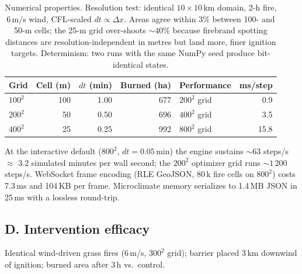 \documentclass[11pt]{article}
\begin{document}
\begin{table}[htbp]
\centering
\caption{Numerical properties. Resolution test: identical
$10{\times}10$\,km domain, 2-h fire, 6\,m/s wind, CFL-scaled
$dt \propto \Delta x$. Areas agree within 3\% between 100- and 50-m cells;
the 25-m grid over-shoots ${\sim}40\%$ because firebrand spotting
distances are resolution-independent in metres but land more, finer
ignition targets. Determinism: two runs with the same NumPy seed produce
bit-identical states.}
\begin{tabular}{lrrr@{\qquad}lr}
\toprule
Grid & Cell (m) & $dt$ (min) & Burned (ha) & Performance & ms/step \\
\midrule
$100^2$ & 100 & 1.00 & 677 & $200^2$ grid & 0.9 \\
$200^2$ &  50 & 0.50 & 696 & $400^2$ grid & 3.5 \\
$400^2$ &  25 & 0.25 & 992 & $800^2$ grid & 15.8 \\
\bottomrule
\end{tabular}
\end{table}

\noindent At the interactive default ($800^2$, $dt=0.05$\,min) the engine
sustains ${\sim}63$ steps/s $\approx$ 3.2 simulated minutes per wall second;
the $200^2$ optimizer grid runs ${\sim}1\,200$ steps/s. WebSocket frame
encoding (RLE GeoJSON, 80\,k fire cells on $800^2$) costs 7.3\,ms and
104\,KB per frame. Microclimate memory serializes to 1.4\,MB JSON in
25\,ms with a lossless round-trip.

\subsection*{D. Intervention efficacy}

Identical wind-driven grass fires (6\,m/s, $300^2$ grid); barrier placed
3\,km downwind of ignition; burned area after 3\,h vs.\ control.
\end{document}
